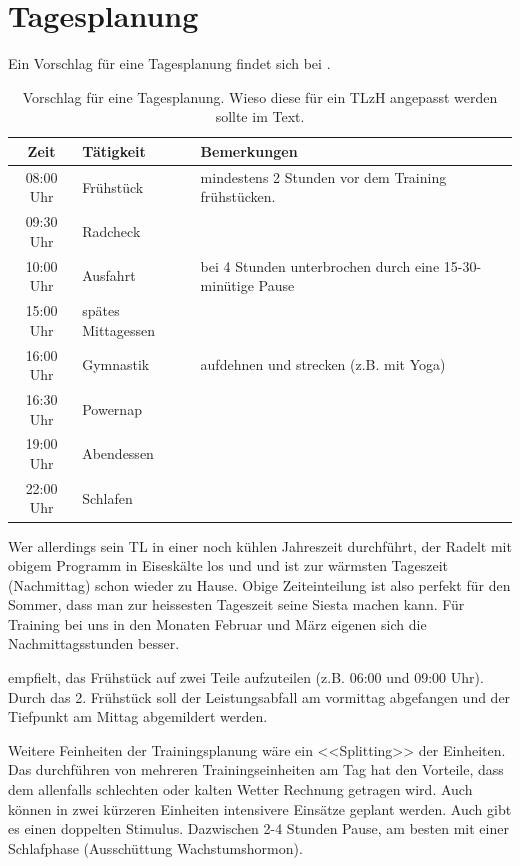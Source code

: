 \documentclass[a4paper,DIV13,BCOR0cm]{scrartcl}
\newcommand{\tlzh}{TLzH}
\begin{document}
 

\section{Tagesplanung}

Ein Vorschlag für eine Tagesplanung findet sich bei .

\begin{table}
  \centering
  \begin{tabular}{cll}
    \toprule
    Zeit & Tätigkeit & Bemerkungen \\
    \midrule
 08:00 Uhr & Frühstück & mindestens 2 Stunden vor dem Training frühstücken.\\
  09:30 Uhr & Radcheck & \\
  10:00 Uhr & Ausfahrt & bei 4 Stunden unterbrochen durch eine 15-30-minütige Pause \\
  15:00 Uhr & spätes Mittagessen & \\
  16:00 Uhr & Gymnastik & aufdehnen und strecken (z.B. mit Yoga) \\
  16:30 Uhr & Powernap & \\
  19:00 Uhr & Abendessen & \\
  22:00 Uhr & Schlafen & \\
    \bottomrule
  \end{tabular}
  \caption{Vorschlag für eine Tagesplanung. Wieso diese für ein \tlzh{} angepasst werden sollte im Text. }
  \label{tab:tagesplanboehme}
\end{table}


Wer allerdings sein TL in einer noch kühlen Jahreszeit durchführt, der Radelt mit obigem Programm
in Eiseskälte los und und ist zur wärmsten Tageszeit (Nachmittag) schon wieder zu Hause.
Obige Zeiteinteilung ist also perfekt für den Sommer, dass man zur heissesten Tageszeit seine Siesta machen kann.
Für Training bei uns in den Monaten Februar und März eigenen sich die Nachmittagsstunden besser.

 empfielt, das Frühstück auf zwei
Teile aufzuteilen (z.B. 06:00 und 09:00 Uhr). Durch das 2. Frühstück
soll der Leistungsabfall am vormittag abgefangen und der Tiefpunkt am Mittag
abgemildert werden.

Weitere Feinheiten der Trainingsplanung wäre ein <<Splitting>> der Einheiten.
Das durchführen von mehreren Trainingseinheiten am Tag hat den Vorteile,
dass dem allenfalls schlechten oder kalten Wetter Rechnung getragen wird.
Auch können in zwei kürzeren Einheiten intensivere Einsätze geplant werden.
Auch gibt es einen doppelten Stimulus.
Dazwischen 2-4 Stunden Pause, am besten mit einer Schlafphase (Ausschüttung Wachstumshormon).
\end{document}
